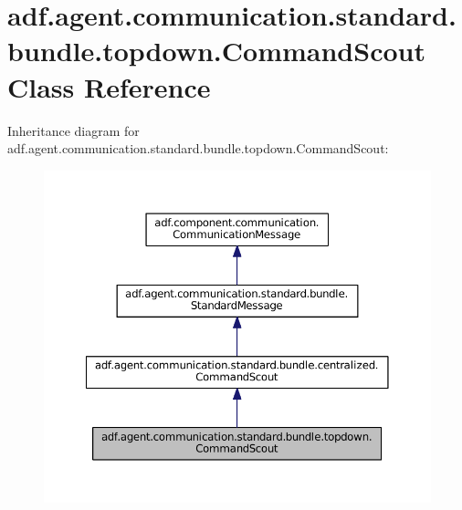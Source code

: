 \hypertarget{classadf_1_1agent_1_1communication_1_1standard_1_1bundle_1_1topdown_1_1CommandScout}{}\section{adf.\+agent.\+communication.\+standard.\+bundle.\+topdown.\+Command\+Scout Class Reference}
\label{classadf_1_1agent_1_1communication_1_1standard_1_1bundle_1_1topdown_1_1CommandScout}


Inheritance diagram for adf.\+agent.\+communication.\+standard.\+bundle.\+topdown.\+Command\+Scout\+:
\nopagebreak
\begin{figure}[H]
\begin{center}
\leavevmode
\includegraphics[width=350pt]{classadf_1_1agent_1_1communication_1_1standard_1_1bundle_1_1topdown_1_1CommandScout__inherit__graph}
\end{center}
\end{figure}


